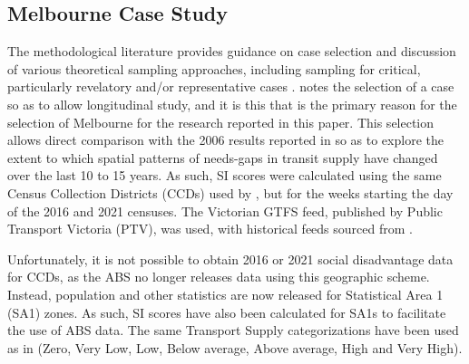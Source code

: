 \documentclass[preprint, 3p,
authoryear]{elsarticle} %
\begin{document}
\hypertarget{melbourne-case-study}{%
\subsection{Melbourne Case Study}\label{melbourne-case-study}}

The methodological literature provides guidance on case selection and
discussion of various theoretical sampling approaches, including
sampling for critical, particularly revelatory and/or representative
cases
\citep{Eisenhardt1989aa, Yin2009aa, Denscombe2007aa, Eisenhardt2007TBfC}.
\citet{Yin2009aa} notes the selection of a case so as to allow
longitudinal study, and it is this that is the primary reason for the
selection of Melbourne for the research reported in this paper. This
selection allows direct comparison with the 2006 results reported in
\citet{currie2010identifying} so as to explore the extent to which
spatial patterns of needs-gaps in transit supply have changed over the
last 10 to 15 years. As such, SI scores were calculated using the same
Census Collection Districts (CCDs) used by
\citet{currie2010identifying}, but for the weeks starting the day of the
2016 and 2021 censuses. The Victorian GTFS feed, published by Public
Transport Victoria (PTV), was used, with historical feeds sourced from
\citet{transitfeeds_victoria:2023aa}.

Unfortunately, it is not possible to obtain 2016 or 2021 social
disadvantage data for CCDs, as the ABS no longer releases data using
this geographic scheme. Instead, population and other statistics are now
released for Statistical Area 1 (SA1) zones. As such, SI scores have
also been calculated for SA1s to facilitate the use of ABS data. The
same Transport Supply categorizations have been used as in
\citet{currie2010identifying} (Zero, Very Low, Low, Below average, Above
average, High and Very High).
\end{document}
